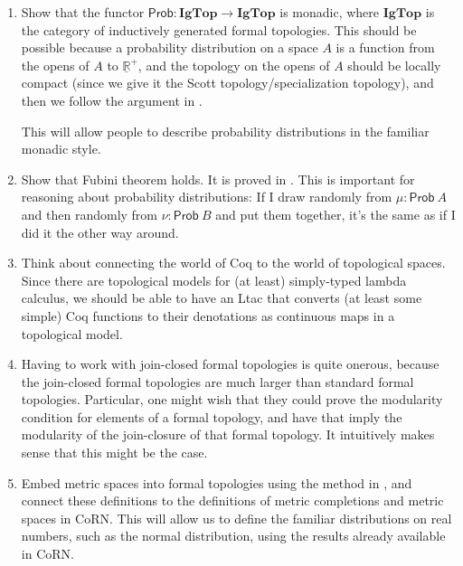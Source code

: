 \documentclass{article}           %
\begin{document}
\begin{enumerate}
\item Show that the functor $\mathsf{Prob} : \mathbf{IgTop} \to \mathbf{IgTop}$ is monadic, where $\mathbf{IgTop}$ is the category of inductively generated formal topologies. This should be possible because a probability distribution on a space $A$ is a function from the opens of $A$ to $\underline{\mathbb{R}}^+$, and the topology on the opens of $A$ should be locally compact (since we give it the Scott topology/specialization topology), and then we follow the argument in \cite{maietti2005}.

This will allow people to describe probability distributions in the familiar monadic style.

\item Show that Fubini theorem holds. It is proved in \cite{vickers2011}. This is important for reasoning about probability distributions: If I draw randomly from $\mu : \mathsf{Prob}\ A$ and then randomly from $\nu : \mathsf{Prob}\ B$ and put them together, it's the same as if I did it the other way around.

\item Think about connecting the world of Coq to the world of topological spaces. Since there are topological models for (at least) simply-typed lambda calculus, we should be able to have an Ltac that converts (at least some simple) Coq functions to their denotations as continuous maps in a topological model. 

\item Having to work with join-closed formal topologies is quite onerous, because the join-closed formal topologies are much larger than standard formal topologies. Particular, one might wish that they could prove the modularity condition for elements of a formal topology, and have that imply the modularity of the join-closure of that formal topology. It intuitively makes sense that this might be the case.

\item Embed metric spaces into formal topologies using the method in \cite{palmgren2007}, and connect these definitions to the definitions of metric completions and metric spaces in CoRN\cite{oconnor2008}. This will allow us to define the familiar distributions on real numbers, such as the normal distribution, using the results already available in CoRN. 

\end{enumerate}



\end{document}
